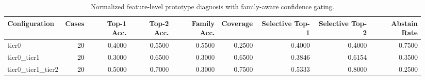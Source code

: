 \begin{table}[t]
\centering
\caption{Normalized feature-level prototype diagnosis with family-aware confidence gating.}
\label{tab:dice_stressor_hierarchical_diagnosis}
\footnotesize
\begin{tabular}{lrrrrrrrr}
\toprule
Configuration & Cases & Top-1 Acc. & Top-2 Acc. & Family Acc. & Coverage & Selective Top-1 & Selective Top-2 & Abstain Rate \\
\midrule
tier0 & 20 & 0.4000 & 0.5500 & 0.5500 & 0.2500 & 0.4000 & 0.4000 & 0.7500 \\
tier0_tier1 & 20 & 0.3000 & 0.6500 & 0.3000 & 0.6500 & 0.3846 & 0.6154 & 0.3500 \\
tier0_tier1_tier2 & 20 & 0.5000 & 0.7000 & 0.3000 & 0.7500 & 0.5333 & 0.8000 & 0.2500 \\
\bottomrule
\end{tabular}

\end{table}
